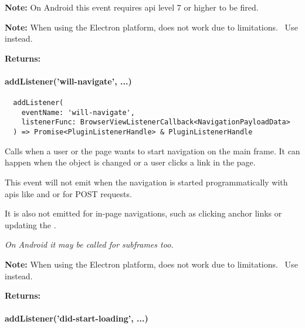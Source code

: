\textbf{Note:} On Android this event requires \ac{api} level 7 or higher to be fired.~\cite{android:api}

\textbf{Note:} When using the Electron platform,  does not work due to limitations.~\cite{capacitor-electron}
Use  instead.

\textbf{Returns:} 


\paragraph{addListener('will-navigate', ...)}

\begin{verbatim}
  addListener(
    eventName: 'will-navigate',
    listenerFunc: BrowserViewListenerCallback<NavigationPayloadData>
  ) => Promise<PluginListenerHandle> & PluginListenerHandle
\end{verbatim}

Calls  when a user or the page wants to start navigation on the main frame.
It can happen when the  object is changed or a user clicks a link in the page.

This event will not emit when the navigation is started programmatically with \acsp{api}
like  and  or for POST requests.

It is also not emitted for in-page navigations, such as clicking anchor links or
updating the .

\textit{On Android it may be called for subframes too.~\cite{android:api}}

\textbf{Note:} When using the Electron platform,  does not work due to limitations.~\cite{capacitor-electron}
Use  instead.

\textbf{Returns:} 


\newpage

\paragraph{addListener('did-start-loading', ...)}


